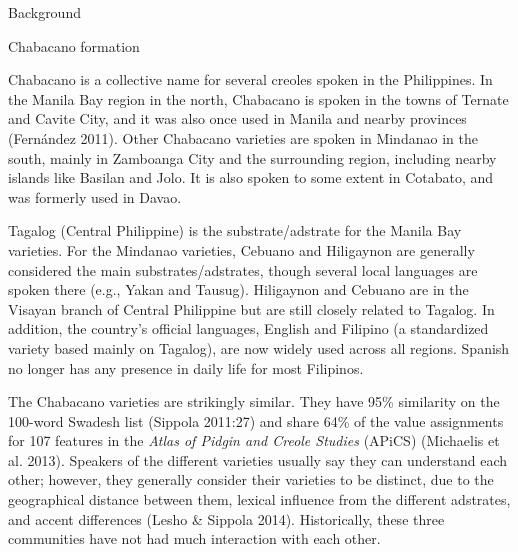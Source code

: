 \begin{listWWNumiiileveli}
\item 
\begin{stylelsSectioni}
Background
\end{stylelsSectioni}

\begin{listWWNumiiilevelii}
\item 
\begin{stylelsSectionii}
Chabacano formation
\end{stylelsSectionii}
\end{listWWNumiiilevelii}
\end{listWWNumiiileveli}
\begin{styleStandard}
Chabacano is a collective name for several creoles spoken in the Philippines. In the Manila Bay region in the north, Chabacano is spoken in the towns of Ternate and Cavite City, and it was also once used in Manila and nearby provinces (Fernández 2011). Other Chabacano varieties are spoken in Mindanao in the south, mainly in Zamboanga City and the surrounding region, including nearby islands like Basilan and Jolo. It is also spoken to some extent in Cotabato, and was formerly used in Davao. 
\end{styleStandard}

\begin{styleStandard}
Tagalog (Central Philippine) is the substrate/adstrate for the Manila Bay varieties. For the Mindanao varieties, Cebuano and Hiligaynon are generally considered the main substrates/adstrates, though several local languages are spoken there (e.g., Yakan and Tausug). Hiligaynon and Cebuano are in the Visayan branch of Central Philippine but are still closely related to Tagalog. In addition, the country's official languages, English and Filipino (a standardized variety based mainly on Tagalog), are now widely used across all regions. Spanish no longer has any presence in daily life for most Filipinos.
\end{styleStandard}

\begin{styleStandard}
The Chabacano varieties are strikingly similar. They have 95\% similarity on the 100-word Swadesh list (Sippola 2011:27) and share 64\% of the value assignments for 107 features in the \textit{Atlas of Pidgin and Creole Studies} (APiCS) (Michaelis et al. 2013). Speakers of the different varieties usually say they can understand each other; however, they generally consider their varieties to be distinct, due to the geographical distance between them, lexical influence from the different adstrates, and accent differences (Lesho \& Sippola 2014). Historically, these three communities have not had much interaction with each other.
\end{styleStandard}

